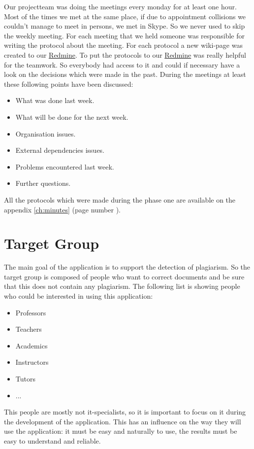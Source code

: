 \minisec{}
Our projectteam was doing the meetings every monday for at least one hour. Most of the times we met at the same place, if due to appointment collisions we couldn't manage to meet in persons, we met in Skype. So we never used to skip the weekly meeting.
\minisec{}
For each meeting that we held someone was responsible for writing the protocol about the meeting. For each protocol a new wiki-page was created to our \href{http://www.redmine.org/}{Redmine}. To put the protocols to our \href{http://www.redmine.org/}{Redmine} was really helpful for the teamwork. So everybody had access to it and could if necessary have a look on the decisions which were made in the past.
\minisec{}
During the meetings at least these following points have been discussed:
\minisec{}
\begin{itemize}
\item What was done last week. 
\item What will be done for the next week.
\item Organisation issues.
\item External dependencies issues.
\item Problems encountered last week.
\item Further questions.
\end{itemize}
\minisec{}
All the protocols which were made during the phase one are available on the appendix \ref{ch:minutes} (page number \pageref{ch:minutes}).

\section{Target Group}

The main goal of the application is to support the detection of plagiarism. So the target group is composed of people who want to correct documents and be sure that this does not contain any plagiarism.
\minisec{}
The following list is showing people who could be interested in using this application:
\minisec{}
\begin{itemize}
\item Professors 
\item Teachers
\item Academics
\item Instructors
\item Tutors
\item ...
\end{itemize}
\minisec{}
This people are mostly not it-specialists, so it is important to focus on it during the development of the application. This has an influence on the way they will use the application: it must be easy and naturally to use, the results must be easy to understand and reliable.

